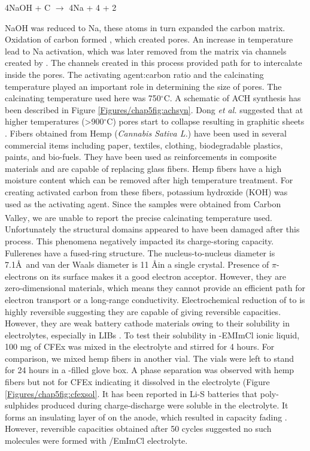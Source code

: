 \begin{center}
    4NaOH + C $\longrightarrow$ 4Na + 4 + 2 \cite{qian_human_2013}
\end{center}

NaOH was reduced to Na, these atoms in turn expanded the carbon matrix. Oxidation of carbon formed , which created pores. An increase in temperature lead to Na activation, which was later removed from the matrix via channels created by . The channels created in this process provided path for  to intercalate inside the pores. The activating agent:carbon ratio and the calcinating temperature played an important role in determining the size of pores. The calcinating temperature used here was 750$^{\circ}$C. A schematic of ACH synthesis has been described in Figure \ref{Figures/chap5fig:achsyn}. Dong \textit{et al.} suggested that at higher temperatures (>900$^{\circ}$C) pores start to collapse resulting in graphitic sheets \cite{dong_commercial_2019}. 
Fibers obtained from Hemp (\textit{Cannabis Sativa L.}) have been used in several commercial items including paper, textiles, clothing, biodegradable plastics, paints, and bio-fuels. They have been used as reinforcements in composite materials and are capable of replacing glass fibers. Hemp fibers have a high moisture content which can be removed after high temperature treatment\cite{hussain_development_2019}. For creating activated carbon from these fibers, potassium hydroxide (KOH) was used as the activating agent. Since the samples were obtained from Carbon Valley\textsuperscript{\textregistered}, we are unable to report the precise calcinating temperature used. Unfortunately the structural domains appeared to have been damaged after this process. This phenomena negatively impacted its charge-storing capacity.  
Fullerenes have a fused-ring structure. The nucleus-to-nucleus diameter is 7.1\AA\ and van der Waals diameter is 11 \AA in a single crystal. Presence of $\pi$-electrons on its surface makes it a good electron acceptor. However, they are zero-dimensional materials, which means they cannot provide an efficient path for electron transport or a long-range conductivity\cite{loutfy_fullerene_2002, winkler_two-component_2007}. Electrochemical reduction of  to  is highly reversible suggesting they are capable of giving reversible capacities. However, they are weak battery cathode materials owing to their solubility in electrolytes, especially in LIBs \cite{seger_prospects_1991}. To test their solubility in -EMImCl ionic liquid, 100 mg of CFEx was mixed in the electrolyte and stirred for 4 hours. For comparison, we mixed hemp fibers in another vial. The vials were left to stand for 24 hours in a -filled glove box. A phase separation was observed with hemp fibers but not for CFEx indicating it dissolved in the electrolyte (Figure \ref{Figures/chap5fig:cfexsol}. It has been reported in Li-S batteries that poly-sulphides produced during charge-discharge were soluble in the electrolyte. It forms an insulating layer of  on the anode, which resulted in capacity fading \cite{sun_effect_2017}. However, reversible capacities obtained after 50 cycles suggested no such molecules were formed with /EmImCl electrolyte. 

